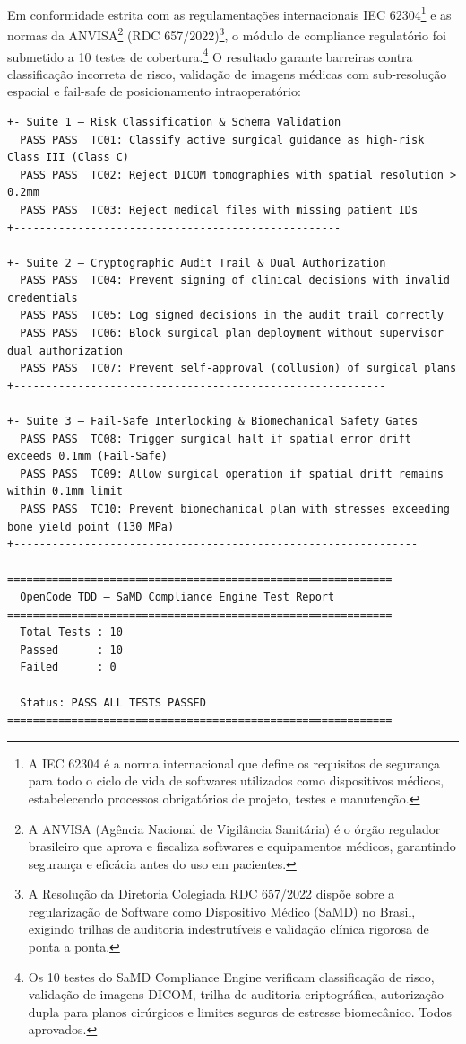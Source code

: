 Em conformidade estrita com as regulamentações internacionais IEC 62304\footnote{A IEC 62304 é a norma internacional que define os requisitos de segurança para todo o ciclo de vida de softwares utilizados como dispositivos médicos, estabelecendo processos obrigatórios de projeto, testes e manutenção.} e as normas da ANVISA\footnote{A ANVISA (Agência Nacional de Vigilância Sanitária) é o órgão regulador brasileiro que aprova e fiscaliza softwares e equipamentos médicos, garantindo segurança e eficácia antes do uso em pacientes.} (RDC 657/2022)\footnote{A Resolução da Diretoria Colegiada RDC 657/2022 dispõe sobre a regularização de Software como Dispositivo Médico (SaMD) no Brasil, exigindo trilhas de auditoria indestrutíveis e validação clínica rigorosa de ponta a ponta.}, o módulo de compliance regulatório foi submetido a 10 testes de cobertura.\footnote{Os 10 testes do SaMD Compliance Engine verificam classificação de risco, validação de imagens DICOM, trilha de auditoria criptográfica, autorização dupla para planos cirúrgicos e limites seguros de estresse biomecânico. Todos aprovados.} O resultado garante barreiras contra classificação incorreta de risco, validação de imagens médicas com sub-resolução espacial e fail-safe de posicionamento intraoperatório:

\begin{lstlisting}[style=bashstyle, caption={Saída do Executor de Testes do SaMD Compliance Engine}, label={lst:tdd_samd_output}]
+- Suite 1 — Risk Classification & Schema Validation
  PASS PASS  TC01: Classify active surgical guidance as high-risk Class III (Class C)
  PASS PASS  TC02: Reject DICOM tomographies with spatial resolution > 0.2mm
  PASS PASS  TC03: Reject medical files with missing patient IDs
+---------------------------------------------------

+- Suite 2 — Cryptographic Audit Trail & Dual Authorization
  PASS PASS  TC04: Prevent signing of clinical decisions with invalid credentials
  PASS PASS  TC05: Log signed decisions in the audit trail correctly
  PASS PASS  TC06: Block surgical plan deployment without supervisor dual authorization
  PASS PASS  TC07: Prevent self-approval (collusion) of surgical plans
+----------------------------------------------------------

+- Suite 3 — Fail-Safe Interlocking & Biomechanical Safety Gates
  PASS PASS  TC08: Trigger surgical halt if spatial error drift exceeds 0.1mm (Fail-Safe)
  PASS PASS  TC09: Allow surgical operation if spatial drift remains within 0.1mm limit
  PASS PASS  TC10: Prevent biomechanical plan with stresses exceeding bone yield point (130 MPa)
+---------------------------------------------------------------

============================================================
  OpenCode TDD — SaMD Compliance Engine Test Report
============================================================
  Total Tests : 10
  Passed      : 10
  Failed      : 0

  Status: PASS ALL TESTS PASSED
============================================================
\end{lstlisting}

